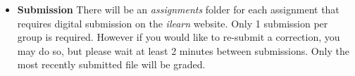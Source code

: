 \documentclass[12pt]{article}
\begin{document}
\begin{itemize}
       
      
     
        \item {\bf Submission} There will be an {\it assignments} folder for each assignment that requires digital submission on the {\it ilearn} website. Only 1 submission per group is required. However if you would like to re-submit a correction, you may do so, but please wait at least 2 minutes between submissions. Only the most recently submitted file will be graded.
            
        
    \end{itemize}

    
\end{document}
